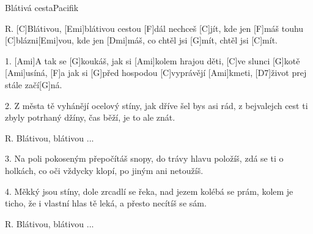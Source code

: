\begin{song}{Blátivá cesta}{Pacifik}

\begin{xverse}{R. }
[C]Blátivou, [Emi]blátivou cestou [F]dál nechceš [C]jít,
kde jen [F]máš touhu [C]blázni[Emi]vou,
kde jen [Dmi]máš, co chtěl jsi [G]mít, chtěl jsi [C]mít.
\end{xverse}

\begin{xverse}{1. }
[Ami]A tak se [G]koukáš, jak si [Ami]kolem hrajou děti,
[C]ve slunci [G]kotě [Ami]usíná,
[F]a jak si [G]před hospodou [C]vyprávějí [Ami]kmeti,
[D7]{}život prej stále začí[G]ná.
\end{xverse}

\begin{xverse}{2. }
Z města tě vyhánějí ocelový stíny,
jak dříve šel bys asi rád,
z bejvalejch cest ti zbyly potrhaný džíny,
čas běží, je to ale znát.
\end{xverse}

\begin{xverse}{R. }
Blátivou, blátivou ...
\end{xverse}

\begin{xverse}{3. }
Na poli pokoseným přepočítáš snopy,
do trávy hlavu položíš,
zdá se ti o holkách, co oči vždycky klopí,
po jiným ani netoužíš.
\end{xverse}

\begin{xverse}{4. }
Měkký jsou stíny, dole zrcadlí se řeka,
nad jezem kolébá se prám,
kolem je ticho, že i vlastní hlas tě leká,
a přesto necítíš se sám.
\end{xverse}

\begin{xverse}{R. }
Blátivou, blátivou ...
\end{xverse}

\end{song}

